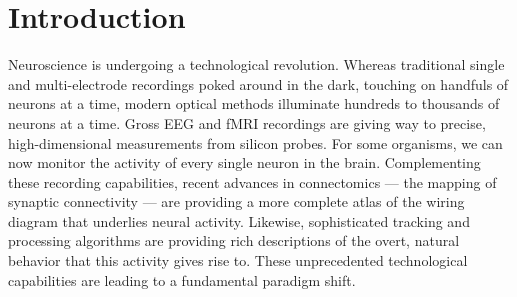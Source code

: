 \chapter{Introduction}
\label{introduction}


Neuroscience is undergoing a technological revolution.
Whereas traditional single and multi-electrode recordings
poked around in the dark, touching on handfuls of neurons
at a time, modern optical methods illuminate hundreds to
thousands of neurons at a time.
Gross EEG and fMRI recordings are giving way to precise,
high-dimensional measurements from silicon probes.
For some organisms, we can now monitor the activity
of every single neuron in the brain.
Complementing these recording capabilities, recent advances in connectomics --- the
mapping of synaptic connectivity --- are providing a
more complete atlas of the wiring diagram that underlies neural
activity.  Likewise, sophisticated tracking and processing algorithms
are providing rich descriptions of the overt, natural behavior that
this activity gives rise to.  These unprecedented technological
capabilities are leading to a fundamental paradigm shift.

